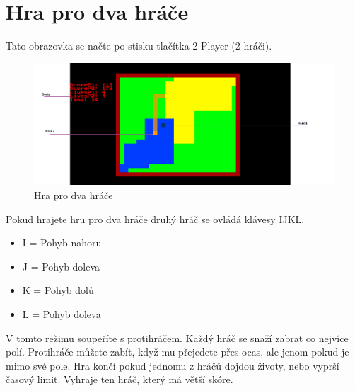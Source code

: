 \documentclass[12pt,a4paper]{report}
\begin{document}
\section{Hra pro dva hráče}
Tato obrazovka se načte po stisku tlačítka 2 Player (2 hráči).
\begin{figure}[H]
    \centering
    \includegraphics[width=\textwidth]{images/twoPlayerGame_desc.png}
    \caption{Hra pro dva hráče}
\end{figure}
Pokud hrajete hru pro dva hráče druhý hráč se ovládá klávesy IJKL.
\begin{itemize}
    \item I = Pohyb nahoru
    \item J = Pohyb doleva
    \item K = Pohyb dolů
    \item L = Pohyb doleva
\end{itemize}
V tomto režimu soupeříte s protihráčem. Každý hráč se snaží zabrat co nejvíce polí.
Protihráče můžete zabít, když mu přejedete přes ocas, ale jenom pokud je mimo své pole.
Hra končí pokud jednomu z hráčů dojdou životy, nebo vyprší časový limit.
Vyhraje ten hráč, který má větší skóre.
\end{document}
